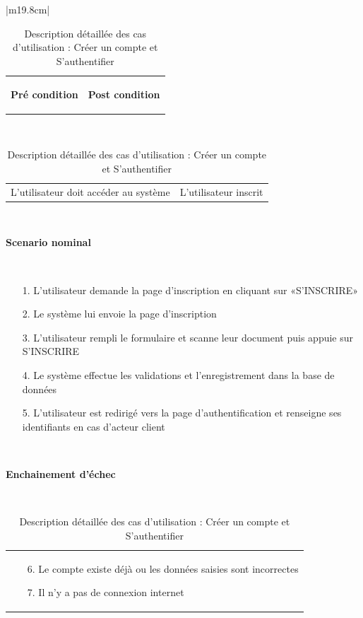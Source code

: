 \begin{table}[h]
\begin{tabular}{|m{19.8cm}|}
\begin{tabular}{m{9.3cm}|m{9.3cm}}
			\begin{center}
				\textbf{Pré condition}
			\end{center}
		 		& 
		 	\begin{center}
				\textbf{Post condition}
			\end{center}
			\\[-4ex]
		\end{tabular}
		\\
		
		\hline
			\begin{tabular}{m{9.3cm}|m{9.3cm}}
			L'utilisateur doit accéder au système
			& 
			L'utilisateur inscrit
		\end{tabular}
		\\
		\hline
			\begin{center}
			\textbf{Scenario nominal}
			\end{center}
		\\
		[-4ex]
		\hline
		\begin{enumerate}
			\item [1.] L’utilisateur demande la page d’inscription en cliquant sur «S'INSCRIRE»
			\item [2.] Le système lui envoie la page d’inscription
			\item [3.] L’utilisateur rempli le formulaire et scanne leur document puis appuie sur S'INSCRIRE
			\item [4.] Le système effectue les validations et l’enregistrement dans la base de données
			\item [5.] L’utilisateur est redirigé vers la page d’authentification et renseigne ses identifiants en cas d'acteur client 
		\end{enumerate}
		\\
		[-4ex]
		\hline	
			\begin{center}
			\textbf{Enchainement d’échec }
		\end{center}
		\\ 
		[-4ex]
		\hline
		\begin{tabular}{m{17.5cm}}
			\begin{enumerate}
				\item [6.] Le compte existe déjà ou les données saisies sont incorrectes
				\item [7.] Il n’y a pas de connexion internet
			\end{enumerate}
			\\[-4ex]
		\end{tabular}
		\\
		\hline	
		
	\end{tabular}
	\centering \caption{Description détaillée des cas d'utilisation : Créer un compte  et S’authentifier}
	\label{4.1}
\end{table}
\newpage


